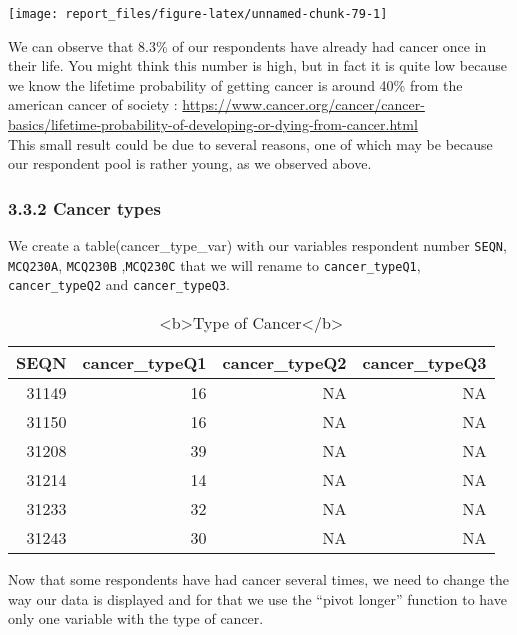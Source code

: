 \documentclass[
]{article}
\begin{document}
\begin{center}\texttt{[image: report\_files/figure-latex/unnamed-chunk-79-1]} \end{center}

We can observe that 8.3\% of our respondents have already had cancer
once in their life. You might think this number is high, but in fact it
is quite low because we know the lifetime probability of getting cancer
is around 40\% from the american cancer of society :
\url{https://www.cancer.org/cancer/cancer-basics/lifetime-probability-of-developing-or-dying-from-cancer.html}\\
This small result could be due to several reasons, one of which may be
because our respondent pool is rather young, as we observed above.

\hypertarget{cancer-types}{%
\subsubsection{3.3.2 Cancer types}\label{cancer-types}}

We create a table(cancer\_type\_var) with our variables respondent
number \texttt{SEQN}, \texttt{MCQ230A}, \texttt{MCQ230B}
,\texttt{MCQ230C} that we will rename to \texttt{cancer\_typeQ1},
\texttt{cancer\_typeQ2} and \texttt{cancer\_typeQ3}.

\begin{table}

\caption{\label{tab:unnamed-chunk-80}<b>Type of Cancer</b>}
\centering
\begin{tabular}[t]{r|r|r|r}
\hline
SEQN & cancer\_typeQ1 & cancer\_typeQ2 & cancer\_typeQ3\\
\hline
31149 & 16 & NA & NA\\
\hline
31150 & 16 & NA & NA\\
\hline
31208 & 39 & NA & NA\\
\hline
31214 & 14 & NA & NA\\
\hline
31233 & 32 & NA & NA\\
\hline
31243 & 30 & NA & NA\\
\hline
\end{tabular}
\end{table}

Now that some respondents have had cancer several times, we need to
change the way our data is displayed and for that we use the ``pivot
longer'' function to have only one variable with the type of cancer.
\end{document}

